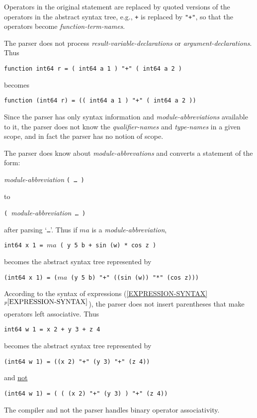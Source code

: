 \documentclass[12pt]{article}
\newcommand{\itemref}[1]{\ref{#1}$^{p\pageref{#1}}$}
\begin{document}
Operators in the original statement are replaced by quoted
versions of the operators in the abstract
syntax tree, e.g., {\tt +} is replaced by {\tt "+"}, so that
the operators become {\em function-term-names}.

The parser does not process {\em result-variable-declarations} or
{\em argument-declarations}.  Thus
\begin{center}
\tt function int64 r = ( int64 a 1 ) "+" ( int64 a 2 )
\end{center}
becomes
\begin{center}
\tt function (int64 r) = (( int64 a 1 ) "+" ( int64 a 2 ))
\end{center}

Since the parser has only syntax information and {\em module-abbreviations}
available to
it, the parser does not know the {\em qualifier-names}
and {\em type-names} in a given scope, and in fact the parser
has no notion of scope.

The parser does know about {\em module-abbrevations} and
converts a statement of the form:
\begin{center}
{\em module-abbreviation} {\tt (~\ldots~)}
\end{center}
to
\begin{center}
{\tt (~}{\em module-abbreviation}{\tt ~\ldots~)}
\end{center}
after parsing `{\tt \ldots}'.  Thus if $ma$ is a {\em module-abbreviation},
\begin{center}
\tt int64 x 1 = $ma$ ( y 5 b + sin (w) * cos z )
\end{center}
becomes the abstract syntax tree represented by
\begin{center}
\tt (int64 x 1) = ($ma$ (y 5 b) "+" ((sin (w)) "*" (cos z)))
\end{center}

According to the syntax of expressions (\itemref{EXPRESSION-SYNTAX}),
the parser does not insert parentheses that make operators
left associative.  Thus
\begin{center}
\tt int64 w 1 = x 2 + y 3 + z 4 
\end{center}
becomes the abstract syntax tree represented by
\begin{center}
\tt (int64 w 1) = ((x 2) "+" (y 3) "+" (z 4))
\end{center}
and \underline{not}
\begin{center}
\tt (int64 w 1) = ( ( (x 2) "+" (y 3) ) "+" (z 4))
\end{center}
The compiler and not the parser handles binary operator associativity.
\end{document}
